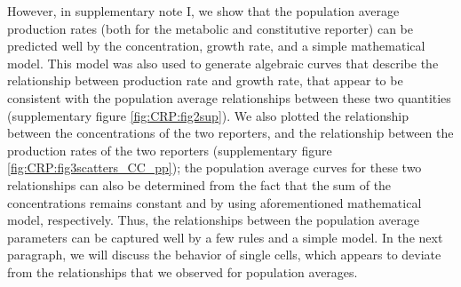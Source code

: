 %
However, in supplementary note I, we show that the population average production rates (both for the metabolic and constitutive reporter) 
can be predicted well by 
the concentration, growth rate, 
and a simple mathematical model.
%
This model was also 
used to generate algebraic curves that describe
the relationship between production rate and growth rate, 
that appear to be consistent with the population average relationships between these two quantities (supplementary figure \ref{fig:CRP:fig2sup}).
%
We also plotted
the relationship between the concentrations of the two reporters,
and the relationship between the production rates of the two reporters (supplementary figure \ref{fig:CRP:fig3scatters_CC_pp});
the population average curves for these two relationships can also be determined from the 
fact that the sum of the concentrations remains constant and by using aforementioned mathematical model, respectively.
%
Thus,
the relationships between the population average parameters can be captured well by a few rules and a simple model.
%
In the next paragraph, we will discuss the behavior of single cells, which
appears to deviate from the relationships that we observed for population averages.






